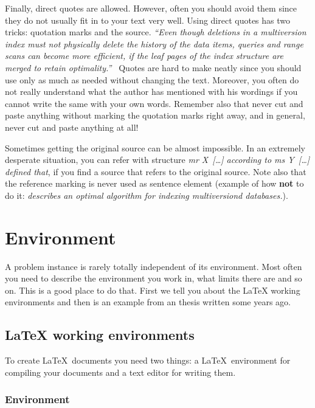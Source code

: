 \documentclass[12pt,a4paper,oneside,pdftex]{report}
\begin{document}
Finally, direct quotes are allowed. However, often you should avoid
them since they do not usually fit in to your text very well. Using
direct quotes has two tricks: quotation marks and the source.  \emph{
  ``Even though deletions in a multiversion index must not physically
  delete the history of the data items, queries and range scans can
  become more efficient, if the leaf pages of the index structure are
  merged to retain optimality.''~\cite{HaapasaloThesis}} Quotes are
hard to make neatly since you should use only as much as needed
without changing the text. Moreover, you often do not really
understand what the author has mentioned with his wordings if you
cannot write the same with your own words. Remember also that never
cut and paste anything without marking the quotation marks right away,
and in general, never cut and paste anything at all!

Sometimes getting the original source can be almost impossible. In an
extremely desperate situation, you can refer with structure \emph{mr
  X~[\ldots] according to ms Y~[\ldots] defined that}, if you find a
source that refers to the original source. Note also that the
reference marking is never used as sentence element (example of how
\textbf{not} to do it: \emph{\cite{HaapasaloThesis} describes
an optimal algorithm for indexing multiversiond databases.}).



% 

\chapter{Environment}
\label{chapter:environment}

A problem instance is rarely totally independent of its environment.
Most often you need to describe the environment you work in, what
limits there are and so on. This is a good place to do that. First we
tell you about the LaTeX working environments and then is an example
from an thesis written some years ago.


\section{LaTeX working environments}
\label{sec:environments}

To create \LaTeX\ documents you need two things: a \LaTeX\ environment for
compiling your documents and a text editor for writing them.

\subsection{Environment}
\end{document}
